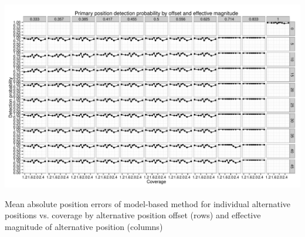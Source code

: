 \begin{FPfigure}
\includegraphics[page=13,width=0.95\textheight,angle=90]{figures/nucleosomes/plots_power_pm3}
\caption{Mean absolute position errors of model-based method for individual alternative positions vs. coverage by alternative position offset (rows) and effective magnitude of alternative position (columns)}
\end{FPfigure}
\afterpage{\clearpage}
